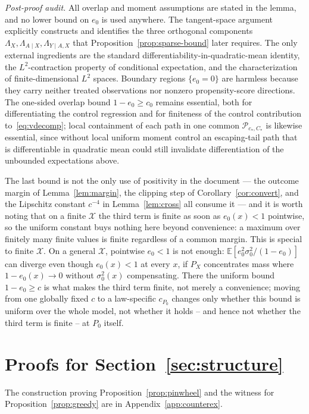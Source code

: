 \documentclass[11pt]{article}
\theoremstyle{plain}
\theoremstyle{definition}
\theoremstyle{remark}
\newcommand{\E}{\mathbb{E}}
\newcommand{\cX}{\mathcal{X}}
\newcommand{\cP}{\mathcal{P}}
\newcommand{\ez}{e_0}
\begin{document}
\noindent\emph{Post-proof audit.} All overlap and moment assumptions are
stated in the lemma, and no lower bound on $\ez$ is used anywhere. The
tangent-space argument explicitly constructs and identifies the three
orthogonal components $\Lambda_X,\Lambda_{A\mid X},\Lambda_{Y\mid A,X}$
that Proposition~\ref{prop:sparse-bound} later requires. The only external
ingredients are the standard differentiability-in-quadratic-mean identity,
the $L^2$-contraction property of conditional expectation, and the
characterization of finite-dimensional $L^2$ spaces. Boundary regions
$\{\ez=0\}$ are harmless because they carry neither treated observations
nor nonzero propensity-score directions. The one-sided overlap bound
$1-\ez\ge c_0$ remains essential, both for differentiating the control
regression and for finiteness of the control contribution
to~\eqref{eq:vdecomp}; local containment of each path in one common
$\cP_{c_*,C_*}$ is likewise essential, since without local uniform moment
control an escaping-tail path that is differentiable in quadratic mean
could still invalidate differentiation of the unbounded expectations above.

\noindent The last bound is not the only use of positivity in the document ---
the outcome margin of Lemma~\ref{lem:margin}, the clipping step of
Corollary~\ref{cor:convert}, and the Lipschitz constant $c^{-4}$ in
Lemma~\ref{lem:cross} all consume it --- and it is worth noting that on a finite
$\cX$ the third term is finite as soon as $\ez(x)<1$ pointwise, so the uniform
constant buys nothing here beyond convenience: a maximum over finitely many
finite values is finite regardless of a common margin. This is special to
finite $\cX$. On a general $\cX$, pointwise $\ez<1$ is not enough:
$\E[\ez^2\sigma_0^2/(1-\ez)]$ can diverge even though $\ez(x)<1$ at every $x$,
if $P_X$ concentrates mass where $1-\ez(x)\to0$ without $\sigma_0^2(x)$
compensating. There the uniform bound $1-\ez\ge c$ is what makes the third
term finite, not merely a convenience; moving from one globally fixed $c$
to a law-specific $c_{P_0}$ changes only whether this bound is uniform over
the whole model, not whether it holds -- and hence not whether the third
term is finite -- at $P_0$ itself.

\section{Proofs for Section~\ref{sec:structure}}\label{app:structure}

The construction proving Proposition~\ref{prop:pinwheel} and the witness for
Proposition~\ref{prop:greedy} are in Appendix~\ref{app:counterex}.
\end{document}
